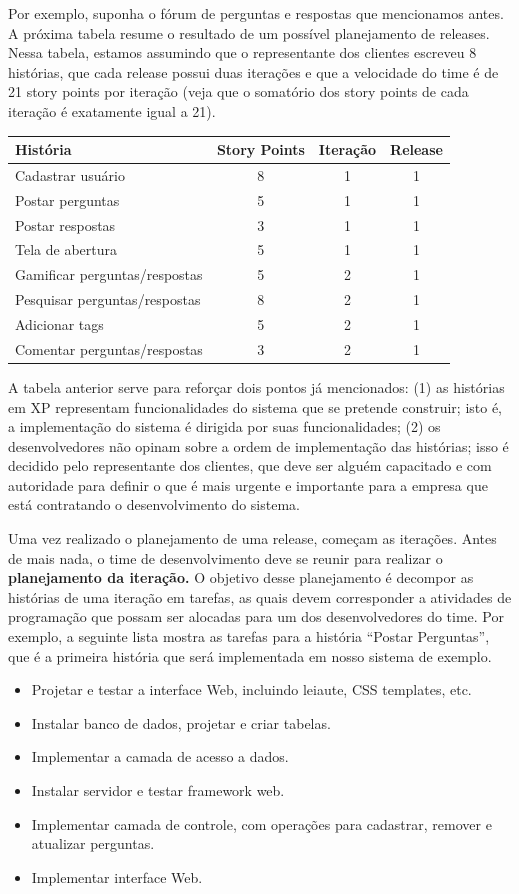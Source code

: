 \documentclass[
  11pt,
  twoside]{book}
\begin{document}
Por exemplo, suponha o fórum de perguntas e respostas que mencionamos
antes. A próxima tabela resume o resultado de um possível planejamento
de releases. Nessa tabela, estamos assumindo que o representante dos
clientes escreveu 8 histórias, que cada release possui duas iterações e
que a velocidade do time é de 21 story points por iteração (veja que o
somatório dos story points de cada iteração é exatamente igual a 21).

\begin{longtable}[]{@{}lccc@{}}
\toprule
\textbf{História} & \textbf{Story Points} & \textbf{Iteração} &
\textbf{Release}\tabularnewline
\midrule
\endhead
Cadastrar usuário & 8 & 1 & 1\tabularnewline
Postar perguntas & 5 & 1 & 1\tabularnewline
Postar respostas & 3 & 1 & 1\tabularnewline
Tela de abertura & 5 & 1 & 1\tabularnewline
Gamificar perguntas/respostas & 5 & 2 & 1\tabularnewline
Pesquisar perguntas/respostas & 8 & 2 & 1\tabularnewline
Adicionar tags & 5 & 2 & 1\tabularnewline
Comentar perguntas/respostas & 3 & 2 & 1\tabularnewline
\bottomrule
\end{longtable}

A tabela anterior serve para reforçar dois pontos já mencionados: (1) as
histórias em XP representam funcionalidades do sistema que se pretende
construir; isto é, a implementação do sistema é dirigida por suas
funcionalidades; (2) os desenvolvedores não opinam sobre a ordem de
implementação das histórias; isso é decidido pelo representante dos
clientes, que deve ser alguém capacitado e com autoridade para definir o
que é mais urgente e importante para a empresa que está contratando o
desenvolvimento do sistema.

Uma vez realizado o planejamento de uma release, começam as iterações.
Antes de mais nada, o time de desenvolvimento deve se reunir para
realizar o \textbf{planejamento da iteração.} O objetivo desse
planejamento é decompor as histórias de uma iteração em tarefas, as
quais devem corresponder a atividades de programação que possam ser
alocadas para um dos desenvolvedores do time. Por exemplo, a seguinte
lista mostra as tarefas para a história ``Postar Perguntas'', que é a
primeira história que será implementada em nosso sistema de exemplo.

\begin{itemize}
\item
  Projetar e testar a interface Web, incluindo leiaute, CSS templates,
  etc.
\item
  Instalar banco de dados, projetar e criar tabelas.
\item
  Implementar a camada de acesso a dados.
\item
  Instalar servidor e testar framework web.
\item
  Implementar camada de controle, com operações para cadastrar, remover
  e atualizar perguntas.
\item
  Implementar interface Web.
\end{itemize}
\end{document}
